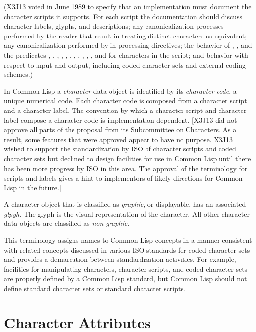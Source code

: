 \begin{newer}
(X3J13 voted in June 1989  to specify that
an implementation must document the character scripts it supports.
For each script the documentation should discuss character labels,
glyphs, and descriptions; any canonicalization processes performed
by the reader that result in treating distinct characters as equivalent;
any canonicalization performed by  in processing directives;
the behavior of , , and the predicates
, , , ,
, , , ,
, , , and 
for characters in the script; and behavior with respect to input and output,
including coded character sets and external coding schemes.)

In Common Lisp a {\it character} data object is identified by its {\it character code},
a unique numerical code.  Each character code is composed from a character script
and a character label.  The convention by which a character script and
character label compose a character code is implementation dependent.
[X3J13 did not approve all parts of the proposal from its Subcommittee
on Characters.  As a result, some features that were approved appear to
have no purpose.  X3J13 wished to support the standardization by ISO of character
scripts and coded character sets but declined to design facilities for use in
Common Lisp until there has been more progress by ISO in this area.
The approval of the terminology for scripts and labels gives a hint
to implementors of likely directions for Common Lisp in the future.]

A character object that is classified as {\it graphic}, or displayable,
has an associated {\it glpyh}.  The glyph is the visual representation
of the character.  All other character data objects are classified as
{\it non-graphic}.

This terminology assigns names to Common Lisp concepts
in a manner consistent with
related concepts discussed in various ISO standards for coded
character sets and provides a demarcation between standardization
activities.  For example, facilities for manipulating characters,
character scripts, and coded character sets are properly defined
by a Common Lisp standard, but Common Lisp should not define
standard character sets or standard character scripts.
\end{newer}

\section{Character Attributes}

